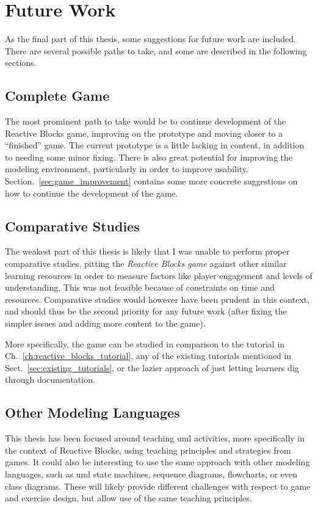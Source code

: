\clearpage

\section{Future Work}
\label{sec:future_work}
As the final part of this thesis, some suggestions for future work are included. There are several possible paths to take, and some are described in the following sections.

\subsection{Complete Game}
The most prominent path to take would be to continue development of the Reactive Blocks game, improving on the prototype and moving closer to a ``finished'' game. The current prototype is a little lacking in content, in addition to needing some minor fixing. There is also great potential for improving the modeling environment, particularly in order to improve usability. Section.~\ref{sec:game_improvement} contains some more concrete suggestions on how to continue the development of the game. 

\subsection{Comparative Studies}
The weakest part of this thesis is likely that I was unable to perform proper comparative studies, pitting the \emph{Reactive Blocks game} against other similar learning resources in order to measure factors like player engagement and levels of understanding. This was not feasible because of constraints on time and resources. Comparative studies would however have been prudent in this context, and should thus be the second priority for any future work (after fixing the simpler issues and adding more content to the game).

\noindent
More specifically, the game can be studied in comparison to the tutorial in Ch.~\ref{ch:reactive_blocks_tutorial}, any of the existing tutorials mentioned in Sect.~\ref{sec:existing_tutorials}, or the lazier approach of just letting learners dig through documentation.

\subsection{Other Modeling Languages}
This thesis has been focused around teaching \gls{uml} activities, more specifically in the context of Reactive Blocks, using teaching principles and strategies from games. It could also be interesting to use the same approach with other modeling languages, such as \gls{uml} state machines, sequence diagrams, flowcharts, or even class diagrams. These will likely provide different challenges with respect to game and exercise design, but allow use of the same teaching principles.